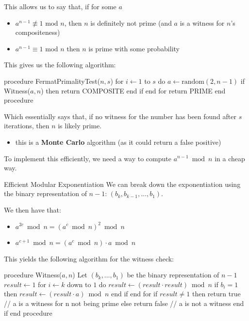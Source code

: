 \documentclass[a4paper, 11pt]{report}
\begin{document}
This allows us to say that, if for some $a$
\begin{itemize}
    \item $a^{n-1} \not \equiv 1 \text{ mod } n$, then $n$ is definitely not prime (and $a$ is a witness for $n$'s compositeness)
    \item $a^{n-1} \equiv 1 \text{ mod } n$ then $n$ is prime with some probability
\end{itemize}

\vspace{1em}
This gives us the following algorithm:
\vspace{0.5em}

\begin{pseudocode}
procedure FermatPrimalityTest($n, s$)
    for $i \gets 1$ to $s$ do
        $a \gets \text{random}(2, n - 1)$
        if Witness($a, n$) then
            return COMPOSITE
        end if
    end for
    return PRIME
end procedure
\end{pseudocode}

Which essentially says that, if no witness for the number has been found after $s$ iterations, then $n$ is likely prime.
\begin{itemize}
    \item this is a \textbf{Monte Carlo} algorithm (as it could return a false positive)
\end{itemize}

To implement this efficiently, we need a way to compute $a^{n-1} \bmod n$ in a cheap way.

\begin{gframe}{Efficient Modular Exponentiation}
We can break down the exponentiation using the binary representation of $n-1$: $(b_k, b_{k-1}, \dots, b_1)$. 

We then have that:
\begin{itemize}
    \item $a^{2c} \bmod n = (a^c \bmod n)^2 \bmod n$
    \item $a^{c+1} \bmod n = (a^c \bmod n) \cdot a \bmod n$
\end{itemize}
\end{gframe}

This yields the following algorithm for the witness check:

\vspace{0.5em}
\begin{pseudocode}
procedure Witness($a, n$)
    Let $(b_k, \dots, b_1)$ be the binary representation of $n-1$
    $result \gets 1$
    for $i \gets k$ down to $1$ do
        $result \gets (result \cdot result) \bmod n$
        if $b_i = 1$ then
            $result \gets (result \cdot a) \bmod n$
        end if
    end for
    if $result \neq 1$ then
        return true // a is a witness for n not being prime
    else
        return false // a is not a witness
    end if
end procedure
\end{pseudocode}
\end{document}
